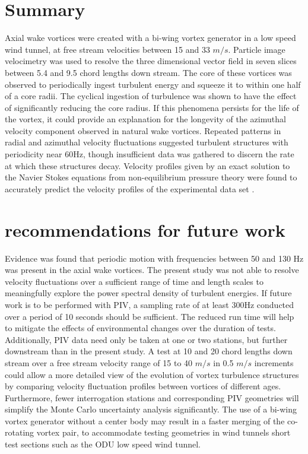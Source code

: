 
\section{Summary}

Axial wake vortices were created with a bi-wing vortex generator in a low speed 
wind tunnel, at free stream velocities between 15 and 33 $m/s$. Particle image 
velocimetry was used to resolve the three dimensional vector field in seven 
slices between 5.4 and 9.5 chord lengths down stream. The core of these 
vortices was observed to periodically ingest turbulent energy and squeeze it to 
within one half of a core radii. The cyclical ingestion of turbulence was shown 
to have the effect of significantly reducing the core radius. If this phenomena 
persists for the life of the vortex, it could provide an explanation for the 
longevity of the azimuthal velocity component observed in natural wake 
vortices. Repeated patterns in radial and azimuthal velocity fluctuations 
suggested turbulent structures with periodicity near 60Hz, though insufficient 
data was gathered to discern the rate at which these structures decay.
Velocity profiles given by an exact solution to the Navier Stokes equations 
from non-equilibrium pressure theory were found to accurately predict 
the velocity profiles of the experimental data set \cite{ash2011}.

\section{recommendations for future work}
Evidence was found that periodic motion with frequencies between 50 and 130 Hz 
was present in the axial wake vortices. The present study was not able to 
resolve velocity fluctuations over a sufficient range of time and length scales 
to meaningfully explore the power spectral density of turbulent energies. If 
future work is to be performed with PIV, a sampling rate of at least 300Hz 
conducted over a period of 10 seconds should be sufficient. The reduced run 
time will help to mitigate the effects of environmental changes over the 
duration of tests. Additionally, PIV 
data need only be taken at one or two stations, but further downstream than in 
the present study. A test at 10 and 20 chord lengths down stream over a free 
stream velocity range of 15 to 40 $m/s$ in 0.5 $m/s$ increments could allow a 
more detailed view of the evolution of vortex turbulence structures by 
comparing velocity fluctuation profiles between vortices of different ages. 
Furthermore, fewer interrogation stations and corresponding PIV geometries will 
simplify the Monte Carlo uncertainty analysis significantly. The use of a 
bi-wing vortex generator without a center body may result in a faster merging 
of the co-rotating vortex pair, to accommodate testing geometries in wind 
tunnels short test sections such as the ODU low speed wind tunnel.
